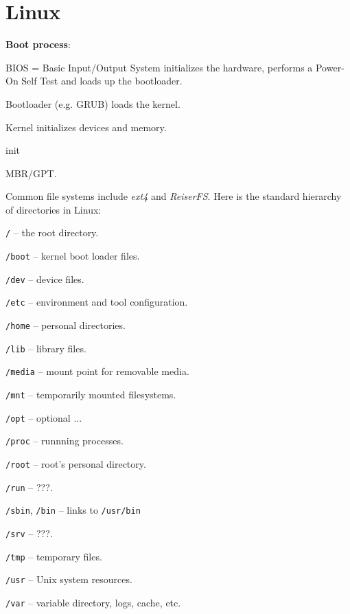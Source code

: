 \section{Linux}
\textbf{Boot process}:
\begin{enumx}
	\item BIOS = Basic Input/Output System initializes the hardware, performs a Power-On Self Test and loads up the bootloader.
	\item Bootloader (e.g. GRUB) loads the kernel.
	\item Kernel initializes devices and memory.
	\item init
\end{enumx}

MBR/GPT. 

Common file systems include \emph{ext4} and \emph{ReiserFS}.
Here is the standard hierarchy of directories in Linux:
\begin{itemx}
\item \texttt{/} -- the root directory.
\item \texttt{/boot} -- kernel boot loader files.
\item \texttt{/dev} -- device files.
\item \texttt{/etc} -- environment and tool configuration.
\item \texttt{/home} -- personal directories.
\item \texttt{/lib} -- library files.
\item \texttt{/media} -- mount point for removable media.
\item \texttt{/mnt} -- temporarily mounted filesystems.
\item \texttt{/opt} -- optional ...
\item \texttt{/proc} -- runnning processes.
\item \texttt{/root} -- root's personal directory.
\item \texttt{/run} -- ???.
\item \texttt{/sbin}, \texttt{/bin} -- links to \texttt{/usr/bin}
\item \texttt{/srv} -- ???.
\item \texttt{/tmp} --  temporary files.
\item \texttt{/usr} -- Unix system resources.
\item \texttt{/var} -- variable directory, logs, cache, etc.
\end{itemx}
